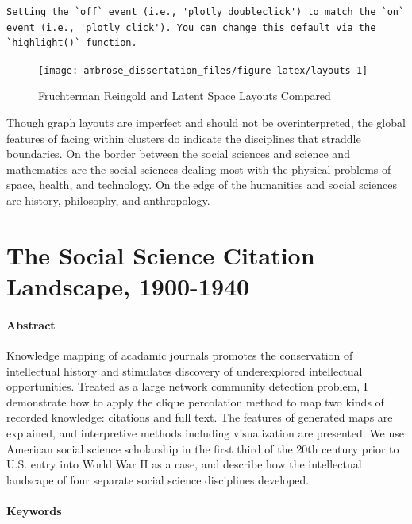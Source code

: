\documentclass[]{book}
\theoremstyle{definition}
\theoremstyle{definition}
\theoremstyle{definition}
\theoremstyle{remark}
\begin{document}
\begin{verbatim}
Setting the `off` event (i.e., 'plotly_doubleclick') to match the `on` event (i.e., 'plotly_click'). You can change this default via the `highlight()` function.
\end{verbatim}

\begin{figure}

{\centering \texttt{[image: ambrose\_dissertation\_files/figure-latex/layouts-1]} 

}

\caption{Fruchterman Reingold and Latent Space Layouts Compared}\label{fig:layouts}
\end{figure}

Though graph layouts are imperfect and should not be overinterpreted,
the global features of facing within clusters do indicate the
disciplines that straddle boundaries. On the border between the social
sciences and science and mathematics are the social sciences dealing
most with the physical problems of space, health, and technology. On the
edge of the humanities and social sciences are history, philosophy, and
anthropology.

\hypertarget{cit}{%
\chapter{The Social Science Citation Landscape, 1900-1940}\label{cit}}

\hypertarget{abstract-2}{%
\subsubsection*{Abstract}\label{abstract-2}}


Knowledge mapping of acadamic journals promotes the
conservation of intellectual history and stimulates discovery of
underexplored intellectual opportunities. Treated as a large network
community detection problem, I demonstrate how to apply the clique
percolation method to map two kinds of recorded knowledge: citations and
full text. The features of generated maps are explained, and
interpretive methods including visualization are presented. We use
American social science scholarship in the first third of the 20th
century prior to U.S. entry into World War II as a case, and describe
how the intellectual landscape of four separate social science
disciplines developed.

\hypertarget{keywords-2}{%
\subsubsection*{Keywords}\label{keywords-2}}
\end{document}
